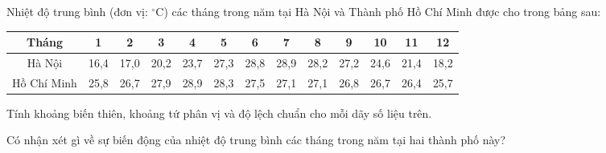 \begin{bt}%
	 Nhiệt độ trung bình (đơn vị: ${ }^{\circ} \mathrm{C}$) các tháng trong năm tại Hà Nội và Thành phố Hồ Chí Minh được cho trong bảng sau:
	\begin{tabular}{|c|c|c|c|c|c|c|c|c|c|c|c|c|}
		\hline Tháng & 1 & 2 & 3 & 4 & 5 & 6 & 7 & 8 & 9 & 10 & 11 & 12 \\
		\hline Hà Nội & 16,4 & 17,0 & 20{,}2 & 23,7 & 27,3 & 28,8 & 28,9 & 28,2 & 27,2 & 24,6 & 21,4 & 18,2 \\
		\hline Hồ Chí Minh & 25,8 & 26,7 & 27,9 & 28,9 & 28,3 & 27,5 & 27,1 & 27,1 & 26,8 & 26,7 & 26,4 & 25,7 \\
		\hline
	\end{tabular}
\begin{listEX}[1]
	\item Tính khoảng biến thiên, khoảng tứ phân vị và độ lệch chuẩn cho mỗi dãy số liệu trên.
	\item Có nhận xét gì về sự biến động của nhiệt độ trung bình các tháng trong năm tại hai thành phố này?
\end{listEX}
\end{bt}
